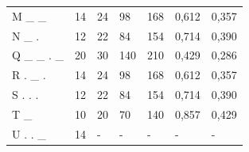 \begin{table}[!htb]
\begin{tabular}{@{}lllllll@{}}
M \_ \_                                  & 14           & 24            & 98            & 168            & 0,612                      & 0,357                        \\
N \_ .                                   & 12           & 22            & 84            & 154            & 0,714                      & 0,390                        \\
Q \_ \_ . \_                             & 20           & 30            & 140           & 210            & 0,429                      & 0,286                        \\
R . \_ .                                 & 14           & 24            & 98            & 168            & 0,612                      & 0,357                        \\
S . . .                                  & 12           & 22            & 84            & 154            & 0,714                      & 0,390                        \\
T \_                                     & 10           & 20            & 70            & 140            & 0,857                      & 0,429                        \\
U . . \_                                 & 14           & -             & -            & -              & -                          & -                            \\ \bottomrule
\end{tabular}
\end{table}

